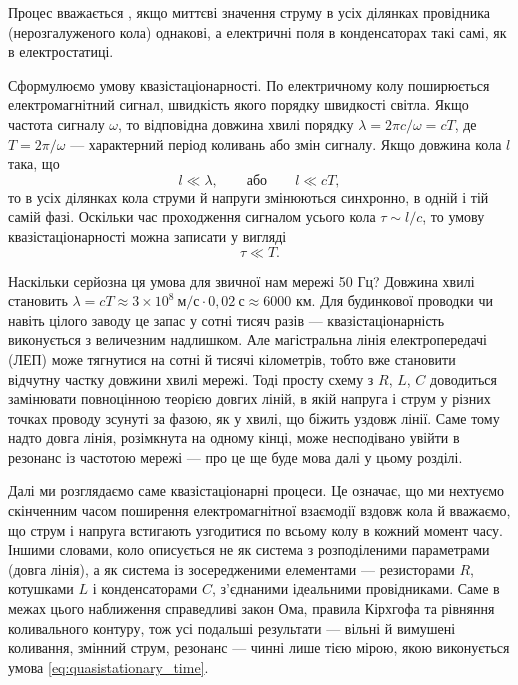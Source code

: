Процес вважається , якщо миттєві значення струму в усіх ділянках провідника (нерозгалуженого кола) однакові, а електричні поля в конденсаторах такі самі, як в електростатиці.

Сформулюємо умову квазістаціонарності. По електричному колу поширюється електромагнітний сигнал, швидкість якого порядку швидкості світла. Якщо частота сигналу $\omega$, то відповідна довжина хвилі порядку $\lambda = 2\pi c/\omega = cT$, де $T = 2\pi/\omega$ --- характерний період коливань або змін сигналу. Якщо довжина кола $l$ така, що
\begin{equation}\label{eq:quasistationary_condition}
	l \ll \lambda, \qquad \text{або} \qquad l \ll cT,
\end{equation}
то в усіх ділянках кола струми й напруги змінюються синхронно, в одній і тій самій фазі. Оскільки час проходження сигналом усього кола $\tau \sim l/c$, то умову квазістаціонарності можна записати у вигляді
\begin{equation}\label{eq:quasistationary_time}
	\tau \ll T.
\end{equation}

\begin{Attention}
	Наскільки серйозна ця умова для звичної нам мережі 50 Гц? Довжина хвилі становить $\lambda = cT \approx 3\times10^{8}\ \text{м/с}\cdot 0{,}02\ \text{с} \approx 6000$ км. Для будинкової проводки чи навіть цілого заводу це запас у сотні тисяч разів --- квазістаціонарність виконується з величезним надлишком. Але магістральна лінія електропередачі (ЛЕП) може тягнутися на сотні й тисячі кілометрів, тобто вже становити відчутну частку довжини хвилі мережі. Тоді просту схему з $R$, $L$, $C$ доводиться замінювати повноцінною теорією довгих ліній, в якій напруга і струм у різних точках проводу зсунуті за фазою, як у хвилі, що біжить уздовж лінії. Саме тому надто довга лінія, розімкнута на одному кінці, може несподівано увійти в резонанс із частотою мережі --- про це ще буде мова далі у цьому розділі.
\end{Attention}

Далі ми розглядаємо саме квазістаціонарні процеси. Це означає, що ми нехтуємо скінченним часом поширення електромагнітної взаємодії вздовж кола й вважаємо, що струм і напруга встигають узгодитися по всьому колу в кожний момент часу. Іншими словами, коло описується не як система з розподіленими параметрами (довга лінія), а як система із зосередженими елементами --- резисторами $R$, котушками $L$ і конденсаторами $C$, з'єднаними ідеальними провідниками. Саме в межах цього наближення справедливі закон Ома, правила Кірхгофа та рівняння коливального контуру, тож усі подальші результати --- вільні й вимушені коливання, змінний струм, резонанс --- чинні лише тією мірою, якою виконується умова \eqref{eq:quasistationary_time}.

